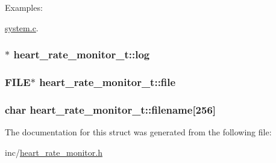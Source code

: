 \begin{Desc}
\item[Examples: ]\par
\hyperlink{system_8c-example}{system.c}.\end{Desc}
\hypertarget{structheart__rate__monitor__t_d4b0199634440986b04f40426e6cb283}{
\subsubsection[log]{$\ast$ {\bf heart\_\-rate\_\-monitor\_\-t::log}}}
\label{structheart__rate__monitor__t_d4b0199634440986b04f40426e6cb283}


\hypertarget{structheart__rate__monitor__t_4c087bccf088749e63bdca77652abe2d}{
\subsubsection[file]{\setlength{\rightskip}{0pt plus 5cm}FILE$\ast$ {\bf heart\_\-rate\_\-monitor\_\-t::file}}}
\label{structheart__rate__monitor__t_4c087bccf088749e63bdca77652abe2d}


\hypertarget{structheart__rate__monitor__t_20fcde7164313c4b95089a9a935091ac}{
\subsubsection[filename]{\setlength{\rightskip}{0pt plus 5cm}char {\bf heart\_\-rate\_\-monitor\_\-t::filename}\mbox{[}256\mbox{]}}}
\label{structheart__rate__monitor__t_20fcde7164313c4b95089a9a935091ac}




The documentation for this struct was generated from the following file:\begin{CompactItemize}
\item 
inc/\hyperlink{heart__rate__monitor_8h}{heart\_\-rate\_\-monitor.h}\end{CompactItemize}
